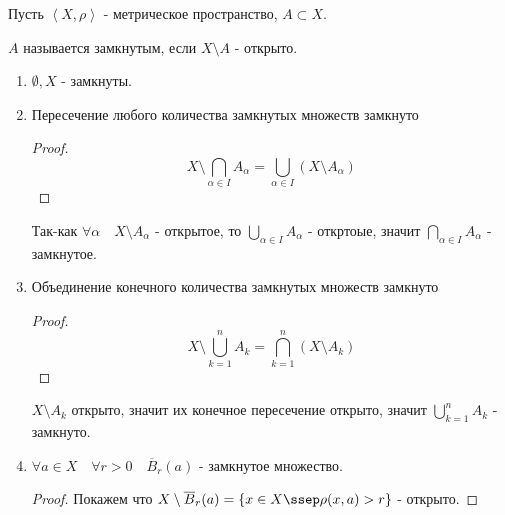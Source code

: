 \begin{definition} \thmslashn 

    Пусть $\left<X, \rho\right>$ - метрическое пространство, $A \subset X$.

    $A$ называется замкнутым, если $X \setminus A$ - открыто. 
\end{definition}
\begin{properties} \thmslashn

    \begin{enumerate}
        \item $ \emptyset, X$ - замкнуты.
        \item Пересечение любого количества замкнутых множеств замкнуто
            \begin{proof} \thmslashn
            
                \begin{equation*}
                        X \setminus \bigcap_{\alpha\in I} A_{\alpha} = \bigcup_{\alpha\in I} (X \setminus A_{\alpha}) 
                \end{equation*}
            \end{proof}

            Так-как $\forall{\alpha}\quad X \setminus A_{\alpha}$ - открытое, то $\bigcup_{\alpha\in I} A_{\alpha}$ - откртоые, значит $\bigcap_{\alpha\in I} A_{\alpha}$ - замкнутое.

        \item Объединение конечного количества замкнутых множеств замкнуто
            \begin{proof} \thmslashn
            
                \begin{equation*}
                    X \setminus \bigcup_{k = 1}^{n} A_{k} = \bigcap_{k = 1}^{n} (X \setminus A_{k})
                \end{equation*}
            \end{proof}

            $X \setminus A_{k}$ открыто, значит их конечное пересечение открыто, значит $\bigcup_{k=1}^{n} A_{k}$ - замкнуто.
        \item $\forall{a\in X}\quad \forall{r > 0}\quad \overline{B}_{r}(a)$ - замкнутое множество.
            \begin{proof} \thmslashn
            
                Покажем что $X \setminus \overline{B}_{r}(a) = \{x\in X \ssep \rho(x, a) > r\} $ - открыто.


\end{proof}
\end{enumerate}
\end{properties}
